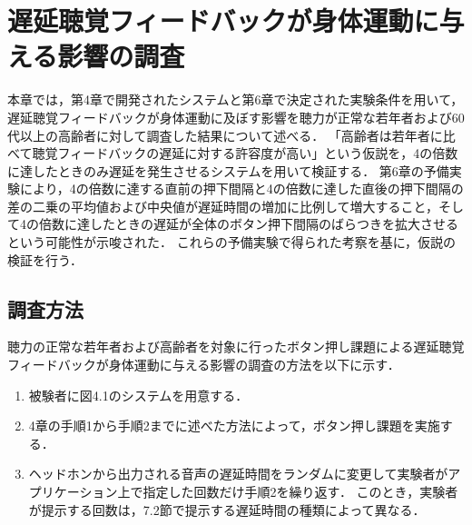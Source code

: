 \chapter{遅延聴覚フィードバックが身体運動に与える影響の調査}
本章では，第4章で開発されたシステムと第6章で決定された実験条件を用いて，遅延聴覚フィードバックが身体運動に及ぼす影響を聴力が正常な若年者および60代以上の高齢者に対して調査した結果について述べる．
「高齢者は若年者に比べて聴覚フィードバックの遅延に対する許容度が高い」という仮説を，4の倍数に達したときのみ遅延を発生させるシステムを用いて検証する．
第6章の予備実験により，4の倍数に達する直前の押下間隔と4の倍数に達した直後の押下間隔の差の二乗の平均値および中央値が遅延時間の増加に比例して増大すること，そして4の倍数に達したときの遅延が全体のボタン押下間隔のばらつきを拡大させるという可能性が示唆された．
これらの予備実験で得られた考察を基に，仮説の検証を行う．
\section{調査方法}
聴力の正常な若年者および高齢者を対象に行ったボタン押し課題による遅延聴覚フィードバックが身体運動に与える影響の調査の方法を以下に示す．
\begin{enumerate}
  \item 被験者に図4.1のシステムを用意する．
  \item 4章の手順1から手順2までに述べた方法によって，ボタン押し課題を実施する．
  \item ヘッドホンから出力される音声の遅延時間をランダムに変更して実験者がアプリケーション上で指定した回数だけ手順2を繰り返す．
  このとき，実験者が提示する回数は，7.2節で提示する遅延時間の種類によって異なる．
\end{enumerate}
